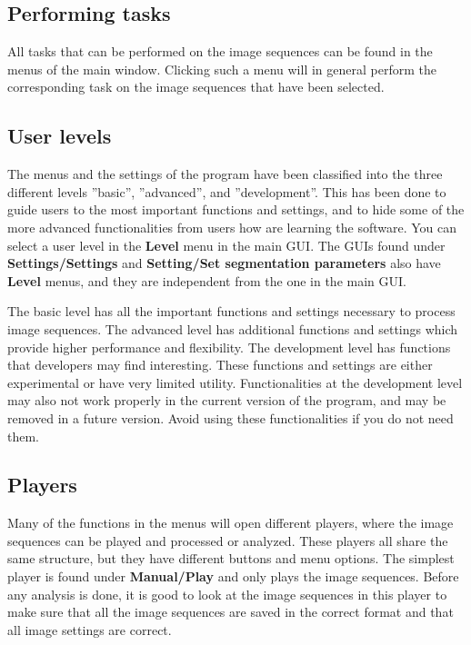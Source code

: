 \documentclass[a4paper, oneside, onecolumn, 11pt]{article}
\newcommand{\menu}[1]{\textbf{#1}}
\newcommand{\setting}[1]{''#1''}
\begin{document}
\subsection{Performing tasks}
All tasks that can be performed on the image sequences can be found in the menus of the main window. Clicking such a menu will in general perform the corresponding task on the image sequences that have been selected.

\subsection{User levels}
The menus and the settings of the program have been classified into the three different levels \setting{basic}, \setting{advanced}, and \setting{development}. This has been done to guide users to the most important functions and settings, and to hide some of the more advanced functionalities from users how are learning the software. You can select a user level in the \menu{Level} menu in the main GUI. The GUIs found under \menu{Settings/Settings} and \menu{Setting/Set segmentation parameters} also have \menu{Level} menus, and they are independent from the one in the main GUI.

The basic level has all the important functions and settings necessary to process image sequences. The advanced level has additional functions and settings which provide higher performance and flexibility. The development level has functions that developers may find interesting. These functions and settings are either experimental or have very limited utility. Functionalities at the development level may also not work properly in the current version of the program, and may be removed in a future version. Avoid using these functionalities if you do not need them.

\subsection{Players}
\label{sec:players}
Many of the functions in the menus will open different players, where the image sequences can be played and processed or analyzed. These players all share the same structure, but they have different buttons and menu options. The simplest player is found under \menu{Manual/\allowbreak Play} and only plays the image sequences. Before any analysis is done, it is good to look at the image sequences in this player to make sure that all the image sequences are saved in the correct format and that all image settings are correct.
\end{document}
